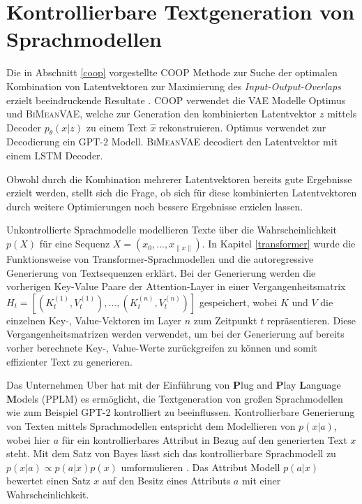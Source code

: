 \section{Kontrollierbare Textgeneration von Sprachmodellen}\raggedbottom
Die in Abschnitt \ref{coop} vorgestellte COOP Methode zur Suche der optimalen Kombination von Latentvektoren zur Maximierung des \textit{Input-Output-Overlaps} erzielt beeindruckende Resultate \citep{coop}.
COOP verwendet die VAE Modelle Optimus und \textsc{BiMeanVAE}, welche zur Generation den kombinierten Latentvektor $z$ mittels Decoder $p_\theta(x|z)$ zu einem Text $\hat{x}$ rekonstruieren.
Optimus verwendet zur Decodierung ein GPT-2 Modell. \textsc{BiMeanVAE} decodiert den Latentvektor mit einem LSTM Decoder.

Obwohl durch die Kombination mehrerer Latentvektoren bereits gute Ergebnisse erzielt werden, stellt sich die Frage, ob sich für diese kombinierten Latentvektoren durch weitere Optimierungen noch bessere Ergebnisse erzielen lassen.

Unkontrollierte Sprachmodelle modellieren Texte über die Wahrscheinlichkeit $p(X)$ für eine Sequenz $X=(x_0,...,x_{\| x \|})$.
In Kapitel \ref{transformer} wurde die Funktionsweise von Transformer-Sprachmodellen und die autoregressive Generierung von Textsequenzen erklärt. 
Bei der Generierung werden die vorherigen Key-Value Paare der Attention-Layer in einer Vergangenheitsmatrix $H_t = [(K_t^{(1)},V_t^{(1)}), \ldots , (K_t^{(n)},V_t^{(n)})]$ gespeichert, wobei $K$ und $V$ die einzelnen Key-, Value-Vektoren im Layer $n$ zum Zeitpunkt $t$ repräsentieren. %
Diese Vergangenheitsmatrizen werden verwendet, um bei der Generierung auf bereits vorher berechnete Key-, Value-Werte zurückgreifen zu können und somit effizienter Text zu generieren.


Das Unternehmen Uber hat mit der Einführung von \textbf{P}lug and \textbf{P}lay \textbf{L}anguage \textbf{M}odels (PPLM) \citep{DBLP:journals/corr/abs-1912-02164} es ermöglicht, die Textgeneration von großen Sprachmodellen wie zum Beispiel GPT-2 kontrolliert zu beeinflussen.
Kontrollierbare Generierung von Texten mittels Sprachmodellen entspricht dem Modellieren von $p(x|a)$, wobei hier $a$ für ein kontrollierbares Attribut in Bezug auf den generierten Text $x$ steht. 
Mit dem Satz von Bayes lässt sich das kontrollierbare Sprachmodell zu $p(x|a)\propto p(a|x)p(x)$ umformulieren \citep{DBLP:journals/corr/abs-1912-02164}. 
Das Attribut Modell $p(a|x)$ bewertet einen Satz $x$ auf den Besitz eines Attributs $a$ mit einer Wahrscheinlichkeit.


